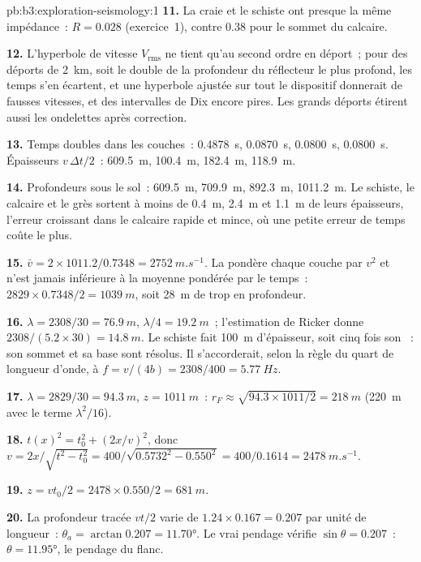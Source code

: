 \begin{solution}{pb:b3:exploration-seismology:1}
\textbf{11.} La craie et le schiste ont presque la même impédance~: $R = 0.028$
(exercice~1), contre 0.38 pour le sommet du calcaire.

\textbf{12.} L'hyperbole de vitesse $V_{\text{rms}}$ ne tient qu'au second ordre
en déport~; pour des déports de \qty{2}{km}, soit le double de la profondeur du
réflecteur le plus profond, les temps s'en écartent, et une hyperbole ajustée
sur tout le dispositif donnerait de fausses vitesses, et des intervalles de Dix encore pires. Les grands déports
étirent aussi les ondelettes après correction.

\textbf{13.} Temps doubles dans les couches~: \qty{0.4878}{s}, \qty{0.0870}{s},
\qty{0.0800}{s}, \qty{0.0800}{s}. Épaisseurs $v\,\Delta t/2$~: \qty{609.5}{m},
\qty{100.4}{m}, \qty{182.4}{m}, \qty{118.9}{m}.

\textbf{14.} Profondeurs sous le sol~: \qty{609.5}{m}, \qty{709.9}{m},
\qty{892.3}{m}, \qty{1011.2}{m}. Le schiste, le calcaire et le grès sortent
à moins de \qty{0.4}{m}, \qty{2.4}{m} et \qty{1.1}{m} de leurs épaisseurs, l'erreur
croissant dans le calcaire rapide et mince, où une petite erreur de temps coûte
le plus.

\textbf{15.} $\bar v = 2\times1011.2/0.7348 = \qty{2752}{m.s^{-1}}$. La  pondère chaque couche par $v^2$ et n'est jamais inférieure à
la moyenne pondérée par le temps~: $2829\times0.7348/2 = \qty{1039}{m}$, soit \qty{28}{m} de trop en profondeur.

\textbf{16.} $\lambda = 2308/30 = \qty{76.9}{m}$, $\lambda/4 = \qty{19.2}{m}$~;
l'estimation de Ricker donne $2308/(5.2\times30) = \qty{14.8}{m}$. Le schiste
fait \qty{100}{m} d'épaisseur, soit cinq fois son ~: son sommet et sa base
sont résolus. Il s'accorderait, selon la règle du quart de longueur d'onde, à $f = v/(4b) =
2308/400 = \qty{5.77}{Hz}$.

\textbf{17.} $\lambda = 2829/30 = \qty{94.3}{m}$, $z = \qty{1011}{m}$~:
$r_F \approx \sqrt{94.3\times1011/2} = \qty{218}{m}$ (\qty{220}{m} avec le
terme $\lambda^2/16$).

\textbf{18.} $t(x)^2 = t_0^2 + (2x/v)^2$, donc $v = 2x/\sqrt{t^2 - t_0^2} =
400/\sqrt{0.5732^2 - 0.550^2} = 400/0.1614 = \qty{2478}{m.s^{-1}}$.

\textbf{19.} $z = vt_0/2 = 2478\times0.550/2 = \qty{681}{m}$.

\textbf{20.} La profondeur tracée $vt/2$ varie de $1.24\times0.167 = 0.207$ par
unité de longueur~: $\theta_a = \arctan0.207 = \ang{11.70}$. Le vrai pendage
vérifie $\sin\theta = 0.207$~: $\theta = \ang{11.95}$, le pendage du flanc.


\end{solution}
